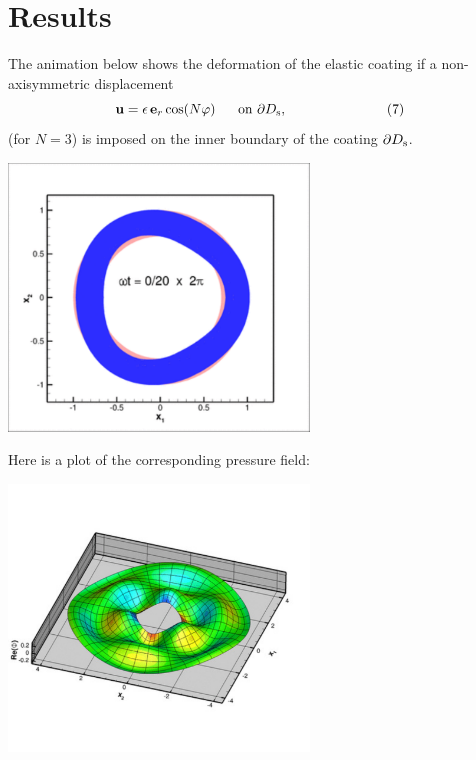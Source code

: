  

\hypertarget{index_results}{}\section{Results}\label{index_results}
The animation below shows the deformation of the elastic coating if a non-\/axisymmetric displacement \[ \mbox{\bf u} = \epsilon \, \mbox{\bf e}_r \cos (N\varphi) \mbox{\ \ \ \ \ on $\partial D_{\rm s}$}, \ \ \ \ \ \ \ \ \ \ \ \ \ \ \ \ \ \ \ \ \ \ (7) \] (for $ N=3 $) is imposed on the inner boundary of the coating $\partial D_{\rm s}$.

 
\begin{DoxyImage}
\includegraphics[width=0.6\textwidth]{anim}
\end{DoxyImage}


Here is a plot of the corresponding pressure field\+:

 
\begin{DoxyImage}
\includegraphics[width=0.6\textwidth]{potential}
\end{DoxyImage}


